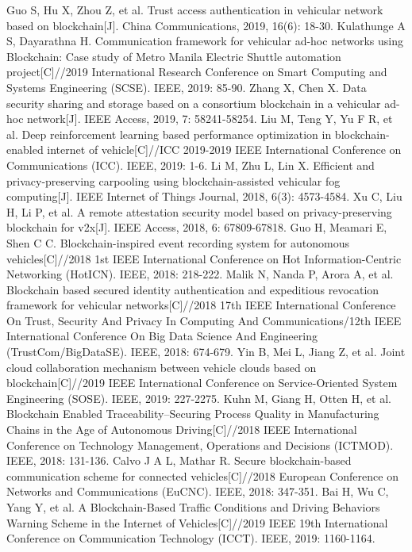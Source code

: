\begin{thebibliography}{99}
 Guo S, Hu X, Zhou Z, et al. Trust access authentication in vehicular network based on blockchain[J]. China Communications, 2019, 16(6): 18-30.
 Kulathunge A S, Dayarathna H. Communication framework for vehicular ad-hoc networks using Blockchain: Case study of Metro Manila Electric Shuttle automation project[C]//2019 International Research Conference on Smart Computing and Systems Engineering (SCSE). IEEE, 2019: 85-90.
 Zhang X, Chen X. Data security sharing and storage based on a consortium blockchain in a vehicular ad-hoc network[J]. IEEE Access, 2019, 7: 58241-58254.
 Liu M, Teng Y, Yu F R, et al. Deep reinforcement learning based performance optimization in blockchain-enabled internet of vehicle[C]//ICC 2019-2019 IEEE International Conference on Communications (ICC). IEEE, 2019: 1-6.
 Li M, Zhu L, Lin X. Efficient and privacy-preserving carpooling using blockchain-assisted vehicular fog computing[J]. IEEE Internet of Things Journal, 2018, 6(3): 4573-4584.
 Xu C, Liu H, Li P, et al. A remote attestation security model based on privacy-preserving blockchain for v2x[J]. IEEE Access, 2018, 6: 67809-67818.
 Guo H, Meamari E, Shen C C. Blockchain-inspired event recording system for autonomous vehicles[C]//2018 1st IEEE International Conference on Hot Information-Centric Networking (HotICN). IEEE, 2018: 218-222.
 Malik N, Nanda P, Arora A, et al. Blockchain based secured identity authentication and expeditious revocation framework for vehicular networks[C]//2018 17th IEEE International Conference On Trust, Security And Privacy In Computing And Communications/12th IEEE International Conference On Big Data Science And Engineering (TrustCom/BigDataSE). IEEE, 2018: 674-679.
 Yin B, Mei L, Jiang Z, et al. Joint cloud collaboration mechanism between vehicle clouds based on blockchain[C]//2019 IEEE International Conference on Service-Oriented System Engineering (SOSE). IEEE, 2019: 227-2275.
 Kuhn M, Giang H, Otten H, et al. Blockchain Enabled Traceability–Securing Process Quality in Manufacturing Chains in the Age of Autonomous Driving[C]//2018 IEEE International Conference on Technology Management, Operations and Decisions (ICTMOD). IEEE, 2018: 131-136.
 Calvo J A L, Mathar R. Secure blockchain-based communication scheme for connected vehicles[C]//2018 European Conference on Networks and Communications (EuCNC). IEEE, 2018: 347-351.
 Bai H, Wu C, Yang Y, et al. A Blockchain-Based Traffic Conditions and Driving Behaviors Warning Scheme in the Internet of Vehicles[C]//2019 IEEE 19th International Conference on Communication Technology (ICCT). IEEE, 2019: 1160-1164.

\end{thebibliography}
